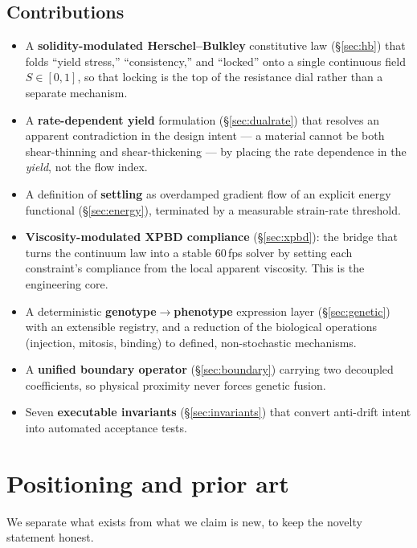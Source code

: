 \documentclass[11pt]{article}
\begin{document}
\subsection{Contributions}
\begin{itemize}[leftmargin=1.4em]
  \item A \textbf{solidity-modulated Herschel--Bulkley} constitutive law (\S\ref{sec:hb}) that
  folds ``yield stress,'' ``consistency,'' and ``locked'' onto a single continuous field
  $S\in[0,1]$, so that locking is the top of the resistance dial rather than a separate mechanism.
  \item A \textbf{rate-dependent yield} formulation (\S\ref{sec:dualrate}) that resolves an
  apparent contradiction in the design intent --- a material cannot be both shear-thinning and
  shear-thickening --- by placing the rate dependence in the \emph{yield}, not the flow index.
  \item A definition of \textbf{settling} as overdamped gradient flow of an explicit energy
  functional (\S\ref{sec:energy}), terminated by a measurable strain-rate threshold.
  \item \textbf{Viscosity-modulated XPBD compliance} (\S\ref{sec:xpbd}): the bridge that turns
  the continuum law into a stable 60\,fps solver by setting each constraint's compliance from
  the local apparent viscosity. This is the engineering core.
  \item A deterministic \textbf{genotype$\rightarrow$phenotype} expression layer
  (\S\ref{sec:genetic}) with an extensible registry, and a reduction of the biological operations
  (injection, mitosis, binding) to defined, non-stochastic mechanisms.
  \item A \textbf{unified boundary operator} (\S\ref{sec:boundary}) carrying two decoupled
  coefficients, so physical proximity never forces genetic fusion.
  \item Seven \textbf{executable invariants} (\S\ref{sec:invariants}) that convert anti-drift
  intent into automated acceptance tests.
\end{itemize}

\section{Positioning and prior art}

We separate what exists from what we claim is new, to keep the novelty statement honest.
\end{document}
